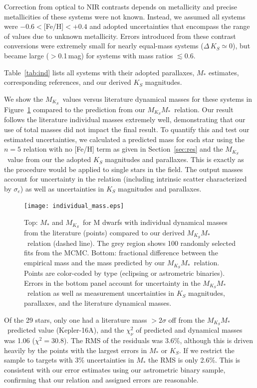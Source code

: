\documentclass[twocolumn]{aastex62}
\newcommand{\mks}{$M_{K_S}$}
\newcommand{\mmk}{$M_{K_S}$\textendash$M_*$}
\begin{document}
Correction from optical to NIR contrasts depends on metallicity \citep[e.g., ][]{Schlaufman2010} and precise metallicities of these systems were not known. Instead, we assumed all systems were $-0.6<$[Fe/H]$<+0.4$ and adopted uncertainties that encompass the range of values due to unknown metallicity. Errors introduced from these contrast conversions were extremely small for nearly equal-mass systems ($\Delta\,K_S\simeq0$), but became large ($>$0.1\,mag) for systems with mass ratios $\lesssim$0.6. 

Table~\ref{tab:ind} lists all systems with their adopted parallaxes, $M_*$ estimates, corresponding references, and our derived $K_S$ magnitudes.

We show the \mks\ values versus literature dynamical masses for these systems in Figure~\ref{fig:ind} compared to the prediction from our \mmk\ relation. Our result follows the literature individual masses extremely well, demonstrating that our use of total masses did not impact the final result. To quantify this and test our estimated uncertainties, we calculated a predicted mass for each star using the $n=5$ relation with no [Fe/H] term as given in Section~\ref{sec:res} and the \mks\ value from our the adopted $K_S$ magnitudes and parallaxes. This is exactly as the procedure would be applied to single stars in the field. The output masses account for uncertainty in the relation (including intrinsic scatter characterized by $\sigma_e$) as well as uncertainties in $K_S$ magnitudes and parallaxes. 

\begin{figure}[th]
\begin{center}
\texttt{[image: individual\_mass.eps]}
\caption{Top: $M_*$ and \mks\ for M dwarfs with individual dynamical masses from the literature (points) compared to our derived \mmk\ relation (dashed line). The grey region shows 100 randomly selected fits from the MCMC. Bottom: fractional difference between the empirical mass and the mass predicted by our \mmk\ relation. Points are color-coded by type (eclipsing or astrometric binaries). Errors in the bottom panel account for uncertainty in the \mmk\ relation as well as measurement uncertainties in $K_S$ magnitudes, parallaxes, and the literature dynamical masses. }
\label{fig:ind}
\end{center}
\end{figure}

Of the 29 stars, only one had a literature mass $>2\sigma$ off from the \mmk\ predicted value (Kepler-16A), and the $\chi^2_\nu$ of predicted and dynamical masses was 1.06 ($\chi^2=30.8$). The RMS of the residuals was 3.6\%, although this is driven heavily by the points with the largest errors in $M_*$ or $K_S$. If we restrict the sample to targets with 3\% uncertainties in $M_*$ the RMS is only 2.6\%. This is consistent with our error estimates using our astrometric binary sample, confirming that our relation and assigned errors are reasonable.
\end{document}
